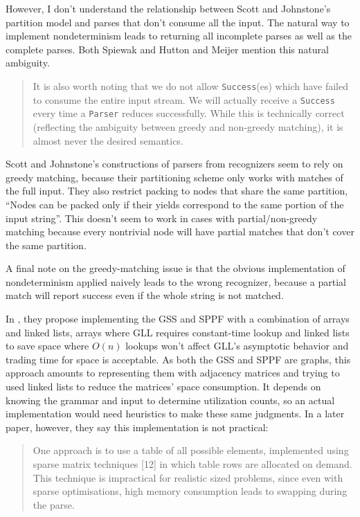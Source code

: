 \documentclass[12pt]{article}
\begin{document}
However, I don't understand the relationship between Scott and
Johnstone's partition model and parses that don't consume all the
input.  The natural way to implement nondeterminism leads to returning
all incomplete parses as well as the complete parses.  Both Spiewak
and Hutton and Meijer mention this natural ambiguity.

\begin{quote}
  It is also worth noting that we do not allow \texttt{Success}(es)
  which have failed to consume the entire input stream.  We will
  actually receive a \texttt{Success} every time a \texttt{Parser}
  reduces successfully. While this is technically correct (reflecting
  the ambiguity between greedy and non-greedy matching), it is almost
  never the desired semantics.\parencite{spiewak}
\end{quote}

Scott and Johnstone's constructions of parsers from recognizers seem
to rely on greedy matching, because their partitioning scheme only
works with matches of the full input.  They also restrict packing to
nodes that share the same partition, ``Nodes can be packed only if
their yields correspond to the same portion of the input
string''\parencite{sppfs_from_recognizers}.  This doesn't seem to work
in cases with partial/non-greedy matching because every nontrivial
node will have partial matches that don't cover the same partition.

A final note on the greedy-matching issue is that the obvious
implementation of nondeterminism applied naively leads to the wrong
recognizer, because a partial match will report success even if the
whole string is not matched.

In \textcite{gll2}, they propose implementing the GSS and SPPF with a
combination of arrays and linked lists, arrays where GLL requires
constant-time lookup and linked lists to save space where $O(n)$
lookups won't affect GLL's asymptotic behavior and trading time for
space is acceptable.  As both the GSS and SPPF are graphs, this
approach amounts to representing them with adjacency matrices and
trying to used linked lists to reduce the matrices' space consumption.
It depends on knowing the grammar and input to determine utilization
counts, so an actual implementation would need heuristics to make
these same judgments.  In a later paper, however, they say this
implementation is not practical:

\begin{quote}
  One approach is to use a table of all possible elements, implemented
  using sparse matrix techniques [12] in which table rows are
  allocated on demand.  This technique is impractical for realistic
  sized problems, since even with sparse optimisations, high memory
  consumption leads to swapping during the parse.\parencite{gll3}
\end{quote}
\end{document}
